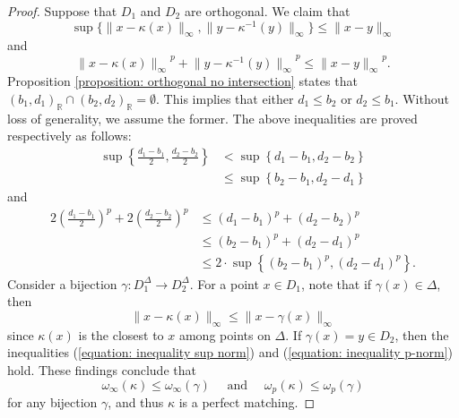 \documentclass[sn-mathphys-num]{sn-jnl}%
\theoremstyle{thmstyleone}%
\theoremstyle{thmstyletwo}%
\theoremstyle{thmstylethree}%
\begin{document}
\begin{proof}
	Suppose that $D_1$ and $D_2$ are orthogonal. We claim that
	\begin{equation}\label{equation: inequality sup norm}
		\sup \big\{\|x-\kappa(x)\|_{\infty},\|y-\kappa^{-1}(y)\|_{\infty}\big\} \leq\|x-y\|_{\infty}
	\end{equation}
	and
	\begin{equation}\label{equation: inequality p-norm}
		{\|x-\kappa(x)\|_\infty}^p+{\|y-\kappa^{-1}(y)\|_\infty}^p \leq {\|x-y\|_\infty}^p.
	\end{equation}
	Proposition \ref{proposition: orthogonal no intersection} states that $\left(b_1, d_1\right)_{\mathbb{R}} \cap\left(b_2, d_2\right)_{\mathbb{R}}=\emptyset$. This implies that either $d_1 \leq b_2$ or $d_2 \leq b_1$. Without loss of generality, we assume the former. The above inequalities are proved respectively as follows:
	\begin{align*}
		\sup \left\{\frac{d_1-b_1}{2}, \frac{d_2-b_2}{2}\right\} & <\sup \left\{d_1-b_1, d_2-b_2\right\} \\
		& \leq \sup \left\{b_2-b_1, d_2-d_1\right\}
	\end{align*}
	and
	\begin{align*}
		2\left(\frac{d_1-b_1}{2}\right)^p+2\left(\frac{d_2-b_2}{2}\right)^p & \leq\left(d_1-b_1\right)^p+\left(d_2-b_2\right)^p \\
		& \leq\left(b_2-b_1\right)^p+\left(d_2-d_1\right)^p\\
		& \leq 2 \cdot \sup\left\{\left(b_2-b_1\right)^p, \left(d_2-d_1\right)^p\right\}.
	\end{align*}
	Consider a bijection $\gamma: D_1^{\Delta} \rightarrow D_2^{\Delta}$. For a point $x \in D_1$, note that if $\gamma(x) \in \Delta$, then
	\begin{equation*}
		\|x-\kappa(x)\|_{\infty} \leq\|x-\gamma(x)\|_{\infty}
	\end{equation*}
	since $\kappa(x)$ is the closest to $x$ among points on $\Delta$. If $\gamma(x)=y \in D_2$, then the inequalities (\ref{equation: inequality sup norm}) and (\ref{equation: inequality p-norm}) hold. These findings conclude that
	\begin{equation*}
		\omega_{\infty}(\kappa) \leq \omega_{\infty}(\gamma) \quad \text { and } \quad \omega_p(\kappa) \leq \omega_p(\gamma)
	\end{equation*}
	for any bijection $\gamma$, and thus $\kappa$ is a perfect matching.
\end{proof}
\end{document}
